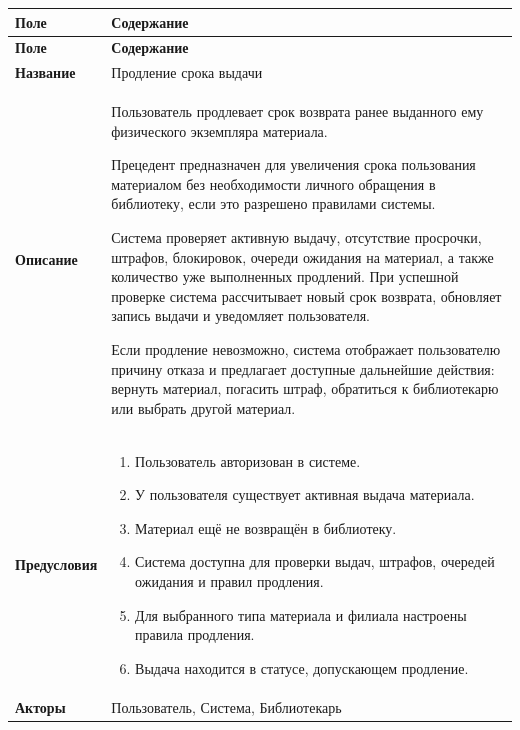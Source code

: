 \documentclass[12pt,a4paper]{article}
\begin{document}
		\begin{xltabular}{\textwidth}{
				|>{\raggedright\arraybackslash}p{2.7cm}
				|>{\raggedright\arraybackslash}X|
			}
			\hline
			\textbf{Поле} & \textbf{Содержание} \\
			\hline
			\endfirsthead
			
			\hline
			\textbf{Поле} & \textbf{Содержание} \\
			\hline
			\endhead
			
			\hline
			\endfoot
			
			\textbf{Название} &
			Продление срока выдачи \\
			\hline
			
			\textbf{Описание} &
			Пользователь продлевает срок возврата ранее выданного ему
			физического экземпляра материала.
			
			Прецедент предназначен для увеличения срока пользования материалом
			без необходимости личного обращения в библиотеку, если это разрешено
			правилами системы.
			
			Система проверяет активную выдачу, отсутствие просрочки, штрафов,
			блокировок, очереди ожидания на материал, а также количество уже
			выполненных продлений. При успешной проверке система рассчитывает
			новый срок возврата, обновляет запись выдачи и уведомляет пользователя.
			
			Если продление невозможно, система отображает пользователю причину
			отказа и предлагает доступные дальнейшие действия: вернуть материал,
			погасить штраф, обратиться к библиотекарю или выбрать другой
			материал. \\
			\hline
			
			\textbf{Предусловия} &
			\begin{enumerate}
				\item Пользователь авторизован в системе.
				\item У пользователя существует активная выдача материала.
				\item Материал ещё не возвращён в библиотеку.
				\item Система доступна для проверки выдач, штрафов, очередей ожидания
				и правил продления.
				\item Для выбранного типа материала и филиала настроены правила
				продления.
				\item Выдача находится в статусе, допускающем продление.
			\end{enumerate} \\
			\hline
			
			\textbf{Акторы} &
			Пользователь, Система, Библиотекарь \\
			\hline
			

\end{xltabular}
\end{document}

